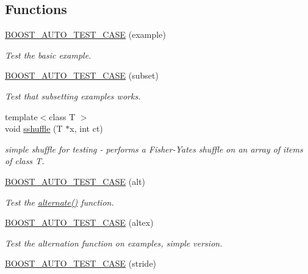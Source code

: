 \subsection*{Functions}
\begin{DoxyCompactItemize}
\item 
\hyperlink{group__basictests_ga95e163533a64ba72e25fc8dfe7fbf065}{B\+O\+O\+S\+T\+\_\+\+A\+U\+T\+O\+\_\+\+T\+E\+S\+T\+\_\+\+C\+A\+SE} (example)
\begin{DoxyCompactList}\small\item\em Test the basic example. \end{DoxyCompactList}\item 
\hyperlink{group__basictests_gacb115fa45cafc60a423957cc29f5052d}{B\+O\+O\+S\+T\+\_\+\+A\+U\+T\+O\+\_\+\+T\+E\+S\+T\+\_\+\+C\+A\+SE} (subset)
\begin{DoxyCompactList}\small\item\em Test that subsetting examples works. \end{DoxyCompactList}\item 
{\footnotesize template$<$class T $>$ }\\void \hyperlink{group__basictests_ga71cbfe9af5a01401f34e7a7ad89237ca}{sshuffle} (T $\ast$x, int ct)
\begin{DoxyCompactList}\small\item\em simple shuffle for testing -\/ performs a Fisher-\/\+Yates shuffle on an array of items of class T. \end{DoxyCompactList}\item 
\hyperlink{group__basictests_gae8675ed7eae8be5e0b3d6b187768c544}{B\+O\+O\+S\+T\+\_\+\+A\+U\+T\+O\+\_\+\+T\+E\+S\+T\+\_\+\+C\+A\+SE} (alt)
\begin{DoxyCompactList}\small\item\em Test the \hyperlink{data_8hpp_a3f60001db133eff96da81b29a43cc8a4}{alternate()} function. \end{DoxyCompactList}\item 
\hyperlink{group__basictests_ga04099944bd3fcadcfd7e5bc9b4a7f12f}{B\+O\+O\+S\+T\+\_\+\+A\+U\+T\+O\+\_\+\+T\+E\+S\+T\+\_\+\+C\+A\+SE} (altex)
\begin{DoxyCompactList}\small\item\em Test the alternation function on examples, simple version. \end{DoxyCompactList}\item 
\hyperlink{group__basictests_gaa493d8803a27251657f4d4ec1e50bfd9}{B\+O\+O\+S\+T\+\_\+\+A\+U\+T\+O\+\_\+\+T\+E\+S\+T\+\_\+\+C\+A\+SE} (stride)

\end{DoxyCompactItemize}
